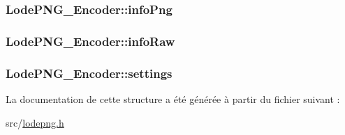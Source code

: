 \subsubsection[{info\+Png}]{ Lode\+P\+N\+G\+\_\+\+Encoder\+::info\+Png}\label{struct_lode_p_n_g___encoder_a5c4bc6d9be898fbcc14b5d762d69457e}
\hypertarget{struct_lode_p_n_g___encoder_af37ca9b0bcecd5d1d68756fd293ab998}{}
\subsubsection[{info\+Raw}]{ Lode\+P\+N\+G\+\_\+\+Encoder\+::info\+Raw}\label{struct_lode_p_n_g___encoder_af37ca9b0bcecd5d1d68756fd293ab998}
\hypertarget{struct_lode_p_n_g___encoder_ae36ceb21b9d1007491f4edbb2be12bab}{}
\subsubsection[{settings}]{ Lode\+P\+N\+G\+\_\+\+Encoder\+::settings}\label{struct_lode_p_n_g___encoder_ae36ceb21b9d1007491f4edbb2be12bab}


La documentation de cette structure a été générée à partir du fichier suivant \+:\begin{DoxyCompactItemize}
\item 
src/\hyperlink{lodepng_8h}{lodepng.\+h}\end{DoxyCompactItemize}
